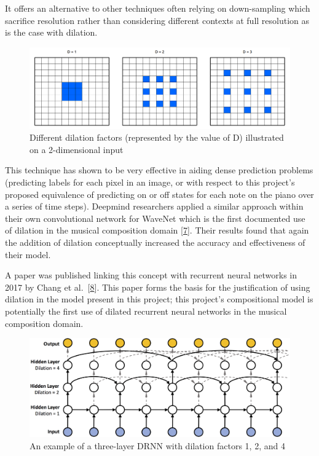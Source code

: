 \documentclass[12pt,]{article}
\begin{document}
It offers an alternative to other techniques often relying on
down-sampling which sacrifice resolution rather than considering
different contexts at full resolution as is the case with dilation.

\begin{figure}
\centering
\includegraphics{Images/dilationconv2.png}
\caption{Different dilation factors (represented by the value of D)
illustrated on a 2-dimensional input}
\end{figure}

This technique has shown to be very effective in aiding dense prediction
problems (predicting labels for each pixel in an image, or with respect
to this project's proposed equivalence of predicting on or off states
for each note on the piano over a series of time steps). Deepmind
researchers applied a similar approach within their own convolutional
network for WaveNet which is the first documented use of dilation in the
musical composition domain
{[}\protect\hyperlink{ref-oord2016wavenet}{7}{]}. Their results found
that again the addition of dilation conceptually increased the accuracy
and effectiveness of their model.

A paper was published linking this concept with recurrent neural
networks in 2017 by Chang et
al.~{[}\protect\hyperlink{ref-chang2017dilated}{8}{]}. This paper forms
the basis for the justification of using dilation in the model present
in this project; this project's compositional model is potentially the
first use of dilated recurrent neural networks in the musical
composition domain.

\begin{figure}
\centering
\includegraphics{Images/dilationrnn.png}
\caption{An example of a three-layer DRNN with dilation factors 1, 2,
and 4}
\end{figure}
\end{document}
